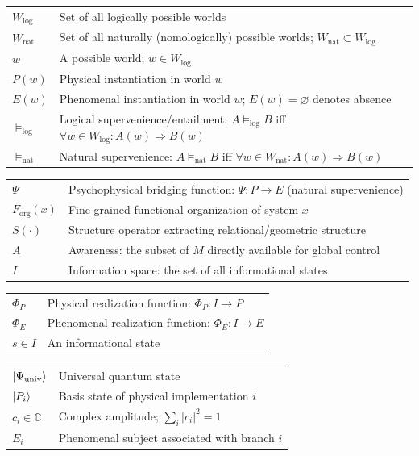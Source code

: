 \documentclass[11pt,a4paper]{article}
\theoremstyle{definition}
\theoremstyle{plain}
\theoremstyle{remark}
\newcommand{\logent}{\vDash_{\text{log}}}
\newcommand{\natent}{\vDash_{\text{nat}}}
\newcommand{\Wlog}{W_{\text{log}}}
\newcommand{\Wnat}{W_{\text{nat}}}
\newcommand{\Forg}{F_{\text{org}}}
\newcommand{\PhiP}{\Phi_{P}}
\newcommand{\PhiE}{\Phi_{E}}
\newcommand{\Psiuniv}{\Psi_{\text{univ}}}
\begin{document}
\begin{tcolorbox}[colback=blue!5,colframe=blue!50,title=\textbf{Modal \& Semantic Operators}]
\begin{tabular}{@{}ll@{}}
$\Wlog$ & Set of all logically possible worlds \\
$\Wnat$ & Set of all naturally (nomologically) possible worlds; $\Wnat \subset \Wlog$ \\
$w$ & A possible world; $w \in \Wlog$ \\
$P(w)$ & Physical instantiation in world $w$ \\
$E(w)$ & Phenomenal instantiation in world $w$; $E(w) = \varnothing$ denotes absence \\
$\logent$ & Logical supervenience/entailment: $A \logent B$ iff $\forall w \in \Wlog: A(w) \Rightarrow B(w)$ \\
$\natent$ & Natural supervenience: $A \natent B$ iff $\forall w \in \Wnat: A(w) \Rightarrow B(w)$
\end{tabular}
\end{tcolorbox}

\begin{tcolorbox}[colback=green!5,colframe=green!50,title=\textbf{Mapping Functions}]
\begin{tabular}{@{}ll@{}}
$\Psi$ & Psychophysical bridging function: $\Psi: P \to E$ (natural supervenience) \\
$\Forg(x)$ & Fine-grained functional organization of system $x$ \\
$S(\cdot)$ & Structure operator extracting relational/geometric structure \\
$A$ & Awareness: the subset of $M$ directly available for global control \\
$I$ & Information space: the set of all informational states
\end{tabular}
\end{tcolorbox}

\begin{tcolorbox}[colback=orange!5,colframe=orange!50,title=\textbf{Information \& Realization}]
\begin{tabular}{@{}ll@{}}
$\PhiP$ & Physical realization function: $\PhiP: I \to P$ \\
$\PhiE$ & Phenomenal realization function: $\PhiE: I \to E$ \\
$s \in I$ & An informational state
\end{tabular}
\end{tcolorbox}

\begin{tcolorbox}[colback=purple!5,colframe=purple!50,title=\textbf{Quantum Mechanical Notation}]
\begin{tabular}{@{}ll@{}}
$\ket{\Psiuniv}$ & Universal quantum state \\
$\ket{P_i}$ & Basis state of physical implementation $i$ \\
$c_i \in \mathbb{C}$ & Complex amplitude; $\sum_i |c_i|^2 = 1$ \\
$E_i$ & Phenomenal subject associated with branch $i$
\end{tabular}
\end{tcolorbox}
\end{document}
